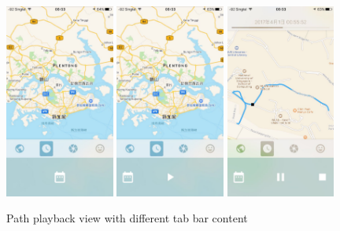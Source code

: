 \documentclass[12pt,a4paper]{article}
\begin{document}
                \begin{figure}
                    \includegraphics[width=0.32\textwidth]{4-1-6-a-real}
                    \includegraphics[width=0.32\textwidth]{4-1-6-b-real}
                    \includegraphics[width=0.32\textwidth]{4-1-6-c-real}
                    \centering
                    \caption{Path playback view with different tab bar content}
                    \label{fig:playback-tab}
                \end{figure}
                
\end{document}
